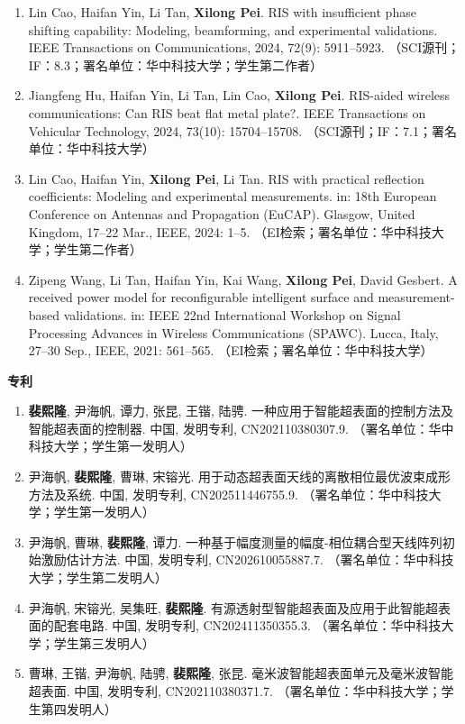 \begin{publications}
\begin{enumerate}
	\item Lin Cao, Haifan Yin, Li Tan, \textbf{Xilong Pei}.
	RIS with insufficient phase shifting capability: Modeling, beamforming, and experimental validations.
	IEEE Transactions on Communications, 2024, 72(9): 5911--5923.
	（SCI源刊；IF：8.3；署名单位：华中科技大学；学生第二作者）
	
	\item Jiangfeng Hu, Haifan Yin, Li Tan, Lin Cao, \textbf{Xilong Pei}.
	RIS-aided wireless communications: Can RIS beat flat metal plate?.
	IEEE Transactions on Vehicular Technology, 2024, 73(10): 15704--15708.
	（SCI源刊；IF：7.1；署名单位：华中科技大学）
	
	\item Lin Cao, Haifan Yin, \textbf{Xilong Pei}, Li Tan.
	RIS with practical reflection coefficients: Modeling and experimental measurements.
	in: 18th European Conference on Antennas and Propagation (EuCAP). 
	Glasgow, United Kingdom, 17--22 Mar., IEEE, 2024: 1--5.
	（EI检索；署名单位：华中科技大学；学生第二作者）
	
	\item Zipeng Wang, Li Tan, Haifan Yin, Kai Wang, \textbf{Xilong Pei}, David Gesbert.
	A received power model for reconfigurable intelligent surface and measurement-based validations.
	in: IEEE 22nd International Workshop on Signal Processing Advances in Wireless Communications (SPAWC).
	Lucca, Italy, 27--30 Sep., IEEE, 2021: 561--565.
	（EI检索；署名单位：华中科技大学）
\end{enumerate}

\noindent
\textbf{专\hspace{2em}利}
\renewcommand{\labelenumi}{[\arabic{enumi}]}
\begin{enumerate}
	\item \textbf{裴熙隆}, 尹海帆, 谭力, 张昆, 王锴, 陆骋.
	一种应用于智能超表面的控制方法及智能超表面的控制器.
	中国, 发明专利, CN202110380307.9.
	（署名单位：华中科技大学；学生第一发明人）
	
	\item 尹海帆, \textbf{裴熙隆}, 曹琳, 宋镕光.
	用于动态超表面天线的离散相位最优波束成形方法及系统.
	中国, 发明专利, CN202511446755.9.
	（署名单位：华中科技大学；学生第一发明人）
	
	\item 尹海帆, 曹琳, \textbf{裴熙隆}, 谭力.
	一种基于幅度测量的幅度-相位耦合型天线阵列初始激励估计方法.
	中国, 发明专利, CN202610055887.7.
	（署名单位：华中科技大学；学生第二发明人）
	
	\item 尹海帆, 宋镕光, 吴集旺, \textbf{裴熙隆}.
	有源透射型智能超表面及应用于此智能超表面的配套电路.
	中国, 发明专利, CN202411350355.3.
	（署名单位：华中科技大学；学生第三发明人）
	
	\item 曹琳, 王锴, 尹海帆, 陆骋, \textbf{裴熙隆}, 张昆.
	毫米波智能超表面单元及毫米波智能超表面.
	中国, 发明专利, CN202110380371.7.
	（署名单位：华中科技大学；学生第四发明人）
\end{enumerate}

\end{publications}
